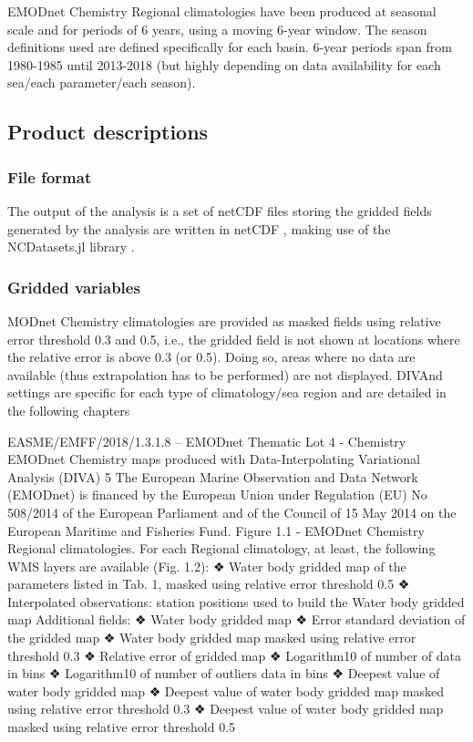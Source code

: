 \documentclass[essd, manuscript]{copernicus}
\begin{document}
EMODnet Chemistry Regional climatologies have been produced at seasonal scale and for periods of 6 years,
using a moving 6-year window. The season definitions used are defined specifically for each basin. 6-year
periods span from 1980-1985 until 2013-2018 (but highly depending on data availability for each sea/each
parameter/each season). 

\subsection{Product descriptions}

\subsubsection{File format}

The output of the analysis is a set of netCDF files storing the gridded fields generated by the analysis are written in netCDF \citep{Rew1990,Brown1993}, making use of the NCDatasets.jl library \citep{Barth2024}.

\subsubsection{Gridded variables}

MODnet Chemistry climatologies are provided as masked fields using relative error threshold 0.3 and
0.5, i.e., the gridded field is not shown at locations where the relative error is above 0.3 (or 0.5). Doing
so, areas where no data are available (thus extrapolation has to be performed) are not displayed. DIVAnd
settings are specific for each type of climatology/sea region and are detailed in the following chapters

EASME/EMFF/2018/1.3.1.8 – EMODnet Thematic Lot 4 - Chemistry
EMODnet Chemistry maps produced with
Data-Interpolating Variational Analysis (DIVA)
5
The European Marine Observation and Data Network (EMODnet) is financed by the European Union under Regulation
(EU) No 508/2014 of the European Parliament and of the Council of 15 May 2014 on the European Maritime and
Fisheries Fund.
Figure 1.1 - EMODnet Chemistry Regional climatologies.
For each Regional climatology, at least, the following WMS layers are available (Fig. 1.2):
❖ Water body gridded map of the parameters listed in Tab. 1, masked using relative error
threshold 0.5
❖ Interpolated observations: station positions used to build the Water body gridded map
Additional fields:
❖ Water body gridded map
❖ Error standard deviation of the gridded map
❖ Water body gridded map masked using relative error threshold 0.3
❖ Relative error of gridded map
❖ Logarithm10 of number of data in bins
❖ Logarithm10 of number of outliers data in bins
❖ Deepest value of water body gridded map
❖ Deepest value of water body gridded map masked using relative error threshold 0.3
❖ Deepest value of water body gridded map masked using relative error threshold 0.5
\end{document}
